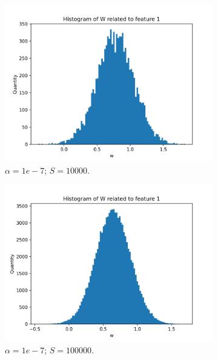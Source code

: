 \documentclass{article}
\begin{document}
\begin{figure}
\begin{subfigure}[t]{0.24\textwidth}
    \includegraphics[width=\linewidth]{hist_feat0_1_sample_10000.png}
    \caption{$\alpha = 1e-7$; $S = 10000$.}
  \end{subfigure}
  \hfill
  \begin{subfigure}[t]{0.24\textwidth}
    \centering
    \includegraphics[width=\linewidth]{hist_feat0_1_sample_100000.png}
    \caption{$\alpha = 1e-7$; $S = 100000$.}
  \end{subfigure}
  \begin{subfigure}[t]{0.24\textwidth}
    \centering

\end{subfigure}
\end{figure}
\end{document}
